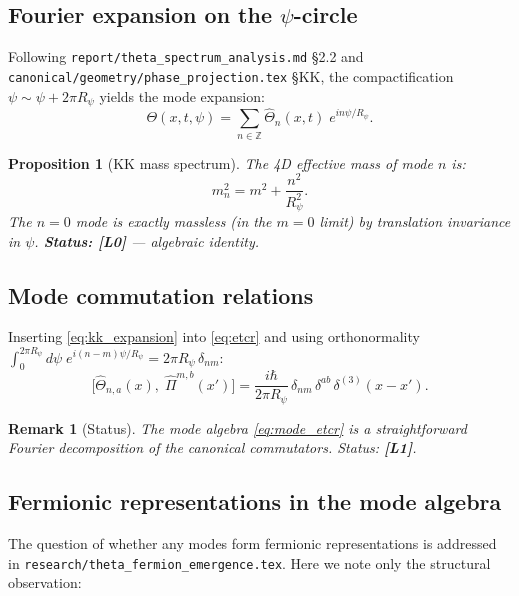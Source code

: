\documentclass[11pt,a4paper]{article}
\newtheorem{proposition}{Proposition}
\newtheorem{remark}{Remark}
\begin{document}
\subsection{Fourier expansion on the \texorpdfstring{$\psi$}{psi}-circle}

Following \texttt{report/theta\_spectrum\_analysis.md} §2.2 and
\texttt{canonical/geometry/phase\_projection.tex} §KK, the compactification
$\psi \sim \psi + 2\pi R_\psi$ yields the mode expansion:
\begin{equation}
\label{eq:kk_expansion}
  \Theta(x, t, \psi)
  = \sum_{n \in \mathbb{Z}} \hat\Theta_n(x, t)\;
    e^{i n \psi / R_\psi}.
\end{equation}

\begin{proposition}[KK mass spectrum]\label{prop:kk_masses}
  The 4D effective mass of mode $n$ is:
  \begin{equation}
  \label{eq:kk_masses}
    m_n^2 = m^2 + \frac{n^2}{R_\psi^2}.
  \end{equation}
  The $n = 0$ mode is exactly massless (in the $m = 0$ limit) by translation
  invariance in $\psi$.
  \textbf{Status: [L0]} — algebraic identity.
\end{proposition}

\subsection{Mode commutation relations}

Inserting \eqref{eq:kk_expansion} into \eqref{eq:etcr} and using
orthonormality $\int_0^{2\pi R_\psi} d\psi\; e^{i(n-m)\psi/R_\psi}
= 2\pi R_\psi\, \delta_{nm}$:
\begin{equation}
\label{eq:mode_etcr}
  \bigl[\hat\Theta_{n,a}(x),\; \hat\Pi^{m,b}(x')\bigr]
  = \frac{i\hbar}{2\pi R_\psi}\, \delta_{nm}\, \delta^{ab}\,
    \delta^{(3)}(x - x').
\end{equation}

\begin{remark}[Status]
  The mode algebra \eqref{eq:mode_etcr} is a straightforward Fourier decomposition
  of the canonical commutators.  Status: \textbf{[L1]}.
\end{remark}

\subsection{Fermionic representations in the mode algebra}

The question of whether any modes form fermionic representations is
addressed in \texttt{research/theta\_fermion\_emergence.tex}.  Here we note
only the structural observation:
\end{document}
